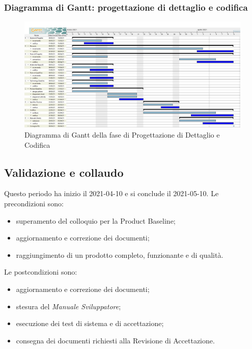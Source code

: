 \subsubsection{Diagramma di Gantt: progettazione di dettaglio e codifica}
\begin{figure}[H]
    \centering
    \includegraphics[scale = 0.25]{components/img/progettazione_dettaglio_codifica.jpg}
    \caption{Diagramma di Gantt della fase di Progettazione di Dettaglio e Codifica}
    \label{fig:Diagramma di Gantt, fase di Progettazione di dettaglio e codifica}
\end{figure}

\newpage
\subsection{Validazione e collaudo}
Questo periodo ha inizio il 2021-04-10 e si conclude il 2021-05-10.
Le precondizioni sono:
\begin{itemize}
	\item superamento del colloquio per la Product Baseline;
	\item aggiornamento e correzione dei documenti;
	\item raggiungimento di un prodotto completo, funzionante e di qualità.
\end{itemize}
Le postcondizioni sono:
\begin{itemize}
	\item aggiornamento e correzione dei documenti;
	\item stesura del \textit{Manuale Sviluppatore};
	\item esecuzione dei test di sistema e di accettazione;
	\item consegna dei documenti richiesti alla Revisione di Accettazione.
\end{itemize}
